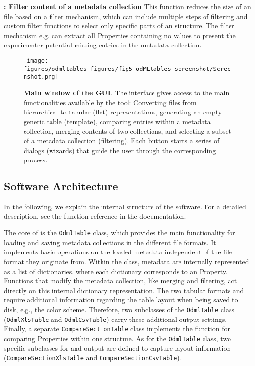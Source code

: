 \textbf{\ffilter: Filter content of a metadata collection} This function reduces the size of an  file based on a filter mechanism, which can include multiple steps of filtering and custom filter functions to select only specific parts of an  structure. The filter mechanism e.g. can extract all Properties containing no values to present the experimenter potential missing entries in the metadata collection.


\begin{figure}[!ht]
\begin{center}
\texttt{[image: figures/odmltables\_figures/fig5\_odMLtables\_screenshot/Screenshot.png]}
\caption[Main window of the  GUI]{{\label{fig:GUI_mainwindow}
\textbf{Main window of the  GUI}. The interface gives access to the main functionalities available by the tool: Converting files from hierarchical to tabular (flat) representations, generating an empty generic  table (template), comparing entries within a metadata collection, merging contents of two collections, and selecting a subset of a metadata collection (filtering). Each button starts a series of dialogs (wizards) that guide the user through the corresponding process.
}}
\end{center}
\end{figure}

\subsection{Software Architecture}
\label{sub:Software-Architecture}

In the following, we explain the internal structure of the  software. For a detailed description, see the function reference in the  documentation.

The core of  is the \texttt{OdmlTable} class, which provides the main functionality for loading and saving metadata collections in the different file formats. It implements basic operations on the loaded metadata independent of the file format they originate from. Within the class, metadata are internally represented as a list of dictionaries, where each dictionary corresponds to an  Property. Functions that modify the metadata collection, like merging and filtering, act directly on this internal dictionary representation. The two tabular formats  and  require additional information regarding the table layout when being saved to disk, e.g., the color scheme. Therefore, two subclasses of the \texttt{OdmlTable} class (\texttt{OdmlXlsTable} and \texttt{OdmlCsvTable}) carry these additional output settings. Finally, a separate \texttt{CompareSectionTable} class implements the function for comparing Properties within one  structure. As for the \texttt{OdmlTable} class, two specific subclasses for  and  output are defined to capture layout information (\texttt{CompareSectionXlsTable} and \texttt{CompareSectionCsvTable}).

